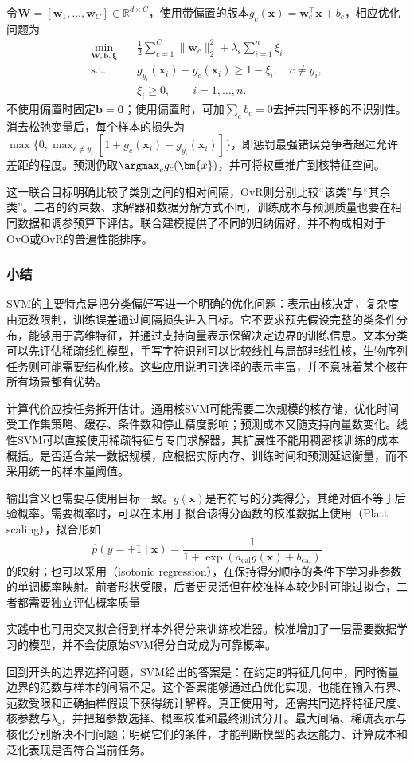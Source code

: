 令$\bm{W}=[\bm{w}_1,\ldots,\bm{w}_C]\in\mathbb{R}^{d\times C}$，使用带偏置的版本$g_c(\bm{x})=\bm{w}_c^{\top}\bm{x}+b_c$，相应优化问题为
\begin{equation}
  \begin{aligned}
    \min_{\bm{W},\bm{b},\bm{\xi}}\quad&
      \frac12\sum_{c=1}^C\lVert\bm{w}_c\rVert_2^2
       +\lambda_{\mathrm{s}}\sum_{i=1}^n\xi_i\\
    \text{s.t.}\quad&
      g_{y_i}(\bm{x}_i)-g_c(\bm{x}_i)\ge1-\xi_i,
      \quad c\ne y_i,\\
    &\xi_i\ge0,\qquad i=1,\ldots,n.
  \end{aligned}
  \label{eq:classification-svm-crammer-singer}
\end{equation}
不使用偏置时固定$\bm{b}=\bm{0}$；使用偏置时，可加$\sum_c b_c=0$去掉共同平移的不识别性。消去松弛变量后，每个样本的损失为$\max\{0,\max_{c\ne y_i}[1+g_c(\bm{x}_i)-g_{y_i}(\bm{x}_i)]\}$，即惩罚最强错误竞争者超过允许差距的程度。预测仍取$\argmax_c g_c(\bm{x})$，并可将权重推广到核特征空间。

这一联合目标明确比较了类别之间的相对间隔，OvR则分别比较“该类”与“其余类”。二者的约束数、求解器和数据分解方式不同，训练成本与预测质量也要在相同数据和调参预算下评估。联合建模提供了不同的归纳偏好，并不构成相对于OvO或OvR的普遍性能排序。

\subsubsection{小结}
\label{sec:classification-svm-summary}
\label{sec:classification-svm-assessment}

SVM的主要特点是把分类偏好写进一个明确的优化问题：表示由核决定，复杂度由范数限制，训练误差通过间隔损失进入目标。它不要求预先假设完整的类条件分布，能够用于高维特征，并通过支持向量表示保留决定边界的训练信息。文本分类可以先评估稀疏线性模型，手写字符识别可以比较线性与局部非线性核，生物序列任务则可能需要结构化核。这些应用说明可选择的表示丰富，并不意味着某个核在所有场景都有优势。

计算代价应按任务拆开估计。通用核SVM可能需要二次规模的核存储，优化时间受工作集策略、缓存、条件数和停止精度影响；预测成本又随支持向量数变化。线性SVM可以直接使用稀疏特征与专门求解器，其扩展性不能用稠密核训练的成本概括。是否适合某一数据规模，应根据实际内存、训练时间和预测延迟衡量，而不采用统一的样本量阈值。

输出含义也需要与使用目标一致。$g(\bm{x})$是有符号的分类得分，其绝对值不等于后验概率。需要概率时，可以在未用于拟合该得分函数的校准数据上使用（Platt scaling），拟合形如
\[
  \widehat p(y=+1\mid\bm{x})
  =\frac1{1+\exp(a_{\mathrm{cal}}g(\bm{x})+b_{\mathrm{cal}})}
\]
的映射；也可以采用（isotonic regression），在保持得分顺序的条件下学习非参数的单调概率映射。前者形状受限，后者更灵活但在校准样本较少时可能过拟合，二者都需要独立评估概率质量

实践中也可用交叉拟合得到样本外得分来训练校准器。校准增加了一层需要数据学习的模型，并不会使原始SVM得分自动成为可靠概率。

回到开头的边界选择问题，SVM给出的答案是：在约定的特征几何中，同时衡量边界的范数与样本的间隔不足。这个答案能够通过凸优化实现，也能在输入有界、范数受限和正确抽样假设下获得统计解释。真正使用时，还需共同选择特征尺度、核参数与$\lambda_{\mathrm{s}}$，并把超参数选择、概率校准和最终测试分开。最大间隔、稀疏表示与核化分别解决不同问题；明确它们的条件，才能判断模型的表达能力、计算成本和泛化表现是否符合当前任务。
